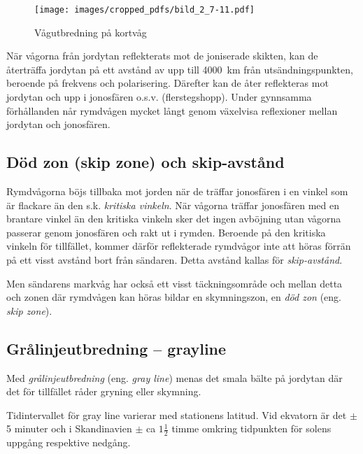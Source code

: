 \begin{figure}
  \texttt{[image: images/cropped\_pdfs/bild\_2\_7-11.pdf]}
  \caption{Vågutbredning på kortvåg}
  \label{fig:bildII7-11}
\end{figure}

När vågorna från jordytan reflekterats mot de joniserade skikten, kan
de återträffa jordytan på ett avstånd av upp till 4000~km från
utsändningspunkten, beroende på frekvens och polarisering.
Därefter kan de åter reflekteras mot jordytan och upp i jonosfären
o.s.v. (flerstegshopp).
Under gynnsamma förhållanden når rymdvågen mycket långt genom växelvisa
reflexioner mellan jordytan och jonosfären.

\subsection{Död zon (skip zone) och skip-avstånd}

Rymdvågorna böjs tillbaka mot jorden när de träffar jonosfären i en
vinkel som är flackare än den s.k. \emph{kritiska vinkeln}.
När vågorna träffar jonosfären med en brantare vinkel än den kritiska vinkeln
sker det ingen avböjning utan vågorna passerar genom jonosfären och rakt ut
i rymden.
Beroende på den kritiska vinkeln för tillfället, kommer därför reflekterade
rymdvågor inte att höras förrän på ett visst avstånd bort från sändaren.
Detta avstånd kallas för \emph{skip-avstånd}.

Men sändarens markvåg har också ett visst täckningsområde och mellan
detta och zonen där rymdvågen kan höras bildar en skymningszon, en
\emph{död zon} (eng. \emph{skip zone}).

\subsection{Grålinjeutbredning -- grayline}

Med \emph{grålinjeutbredning} (eng. \emph{gray line}) menas det smala bälte på
jordytan där det för tillfället råder gryning eller skymning.

Tidintervallet för gray line varierar med stationens latitud.
Vid ekvatorn är det \(\pm\) 5 minuter och i Skandinavien \(\pm\) ca
\(1\frac{1}{2}\) timme omkring tidpunkten för solens uppgång
respektive nedgång.

